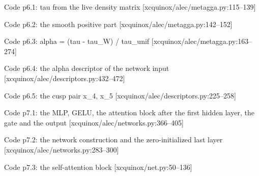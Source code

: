 \begin{frame}[allowframebreaks]{Code p6.1: tau from the live density matrix [xcquinox/alec/metagga.py:115--139]}
\label{code:p6_1_tau_from_the_live_density_matrix}
\end{frame}
\begin{frame}[allowframebreaks]{Code p6.2: the smooth positive part [xcquinox/alec/metagga.py:142--152]}
\label{code:p6_2_the_smooth_positive_part}
\end{frame}
\begin{frame}[allowframebreaks]{Code p6.3: alpha = (tau - tau\_W) / tau\_unif [xcquinox/alec/metagga.py:163--274]}
\label{code:p6_3_alpha_tau_tau_w_tau_unif}
\end{frame}
\begin{frame}[allowframebreaks]{Code p6.4: the alpha descriptor of the network input [xcquinox/alec/descriptors.py:432--472]}
\label{code:p6_4_the_alpha_descriptor_of_the_network_inpu}
\end{frame}
\begin{frame}[allowframebreaks]{Code p6.5: the cusp pair x\_4, x\_5 [xcquinox/alec/descriptors.py:225--258]}
\label{code:p6_5_the_cusp_pair_x_4_x_5}
\end{frame}
\begin{frame}[allowframebreaks]{Code p7.1: the MLP, GELU, the attention block after the first hidden layer, the gate and the output [xcquinox/alec/networks.py:366--405]}
\label{code:p7_1_the_mlp_gelu_the_attention_block_after_t}
\end{frame}
\begin{frame}[allowframebreaks]{Code p7.2: the network construction and the zero-initialized last layer [xcquinox/alec/networks.py:283--300]}
\label{code:p7_2_the_network_construction_and_the_zero_in}
\end{frame}
\begin{frame}[allowframebreaks]{Code p7.3: the self-attention block [xcquinox/net.py:50--136]}
\label{code:p7_3_the_self_attention_block}
\end{frame}
